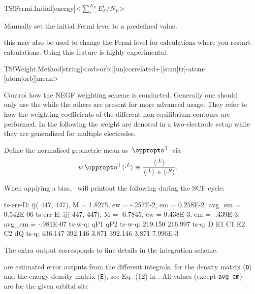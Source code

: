 \begin{fdfentry}{TS!Fermi.Initial}[energy]<$\sum^{N_E}_iE_F^i/N_E$>

  Manually set the initial Fermi level to a predefined value. 

  \note this may also be used to change the Fermi level for
  calculations where you restart calculations. Using this feature is
  highly experimental.
  
\end{fdfentry}

\begin{fdfentry}{TS!Weight.Method}[string]<orb-orb|[[un]correlated+][sum|tr]-atom-[atom|orb]|mean>
  
  Control how the NEGF weighting scheme is conducted. Generally one
  should only use the  while the others are present for
  more advanced usage. They refer to how the weighting coefficients of
  the different non-equilibrium contours are performed. In the
  following the weight are denoted in a two-electrode setup while they
  are generalized for multiple electrodes.

  \def\mypropto{\,\oppropto^{||}\,} %
  \def\mn{{\mu\nu}} %
  Define the normalised geometric mean as $\mypropto$ via
  \begin{equation}
    w\mypropto \langle\cdot^L\rangle\equiv
    \frac{\langle\cdot^L\rangle}{\langle\cdot^L\rangle+\langle\cdot^R\rangle}.
  \end{equation}

  When applying a bias, \tsiesta\ will printout the following during
  the SCF cycle:
\begin{output}[fontsize=\footnotesize]
ts-err-D: ij(  447,   447), M =  1.8275, ew = -.257E-2, em = 0.258E-2. avg_em = 0.542E-06
ts-err-E: ij(  447,   447), M = -6.7845, ew = 0.438E-3, em = -.439E-3. avg_em = -.981E-07
ts-w-q:               qP1       qP2
ts-w-q:           219.150   216.997
ts-q:         D        E1        C1        E2        C2        dQ
ts-q:   436.147   392.146     3.871   392.146     3.871  7.996E-3
  \end{output}
  The extra output corresponds to fine details in the integration
  scheme.
  \begin{description}[labelindent=3em, leftmargin=4.5em]
    \itemsep 10pt
    \parsep 0pt
    
    \item[\texttt{ts-err-*}] are estimated error outputs from the
    different integrals, for the density matrix (\texttt{D}) and the
    energy density matrix (\texttt{E}), see Eq.~(12) in
    \cite{Papior2017}. All values (except \texttt{avg\_em}) are for
    the given orbital site


\end{description}
\end{fdfentry}
